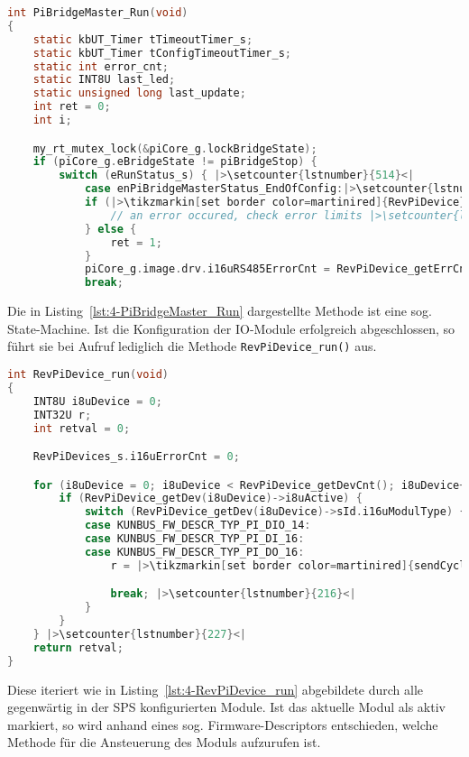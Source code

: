 \begin{lstlisting}[language={c},firstnumber=262,caption={Auszug der Methode \lstinline{PiBridgeMaster_Run(void)} in \lstinline{RevPiDevice.c}\label{lst:4-PiBridgeMaster_Run}}]
int PiBridgeMaster_Run(void)
{
	static kbUT_Timer tTimeoutTimer_s;
	static kbUT_Timer tConfigTimeoutTimer_s;
	static int error_cnt;
	static INT8U last_led;
	static unsigned long last_update;
	int ret = 0;
	int i;

	my_rt_mutex_lock(&piCore_g.lockBridgeState);
	if (piCore_g.eBridgeState != piBridgeStop) {
		switch (eRunStatus_s) { |>\setcounter{lstnumber}{514}<|
		    case enPiBridgeMasterStatus_EndOfConfig:|>\setcounter{lstnumber}{621}<|
		    if (|>\tikzmarkin[set border color=martinired]{RevPiDevice}<|RevPiDevice_run()|>\tikzmarkend{RevPiDevice}<|) {
				// an error occured, check error limits |>\setcounter{lstnumber}{641}<|
			} else {
				ret = 1;
			}
			piCore_g.image.drv.i16uRS485ErrorCnt = RevPiDevice_getErrCnt();
			break;
\end{lstlisting}

Die in Listing~\ref{lst:4-PiBridgeMaster_Run} dargestellte Methode ist eine sog. State-Machine. Ist die Konfiguration der IO-Module erfolgreich abgeschlossen, so führt sie bei Aufruf lediglich die Methode \lstinline{RevPiDevice_run()} aus.

\begin{lstlisting}[language={c},firstnumber=140,caption={Auszug der Methode \lstinline{RevPiDevice_run(void)} in \lstinline{RevPiDevice.c}\label{lst:4-RevPiDevice_run}}]
int RevPiDevice_run(void)
{
	INT8U i8uDevice = 0;
	INT32U r;
	int retval = 0;

	RevPiDevices_s.i16uErrorCnt = 0;

	for (i8uDevice = 0; i8uDevice < RevPiDevice_getDevCnt(); i8uDevice++) {
		if (RevPiDevice_getDev(i8uDevice)->i8uActive) {
			switch (RevPiDevice_getDev(i8uDevice)->sId.i16uModulType) {
			case KUNBUS_FW_DESCR_TYP_PI_DIO_14:
			case KUNBUS_FW_DESCR_TYP_PI_DI_16:
			case KUNBUS_FW_DESCR_TYP_PI_DO_16:
				r = |>\tikzmarkin[set border color=martinired]{sendCyclicTelegram}<|piDIOComm_sendCyclicTelegram(i8uDevice)|>\tikzmarkend{sendCyclicTelegram}\setcounter{lstnumber}{166} <|;

				break; |>\setcounter{lstnumber}{216}<|
			}
		}
	} |>\setcounter{lstnumber}{227}<|
	return retval;
}
\end{lstlisting}

Diese iteriert wie in Listing~\ref{lst:4-RevPiDevice_run} abgebildete durch alle gegenwärtig in der SPS konfigurierten Module. Ist das aktuelle Modul als aktiv markiert, so wird anhand eines sog. Firmware-Descriptors entschieden, welche Methode für die Ansteuerung des Moduls aufzurufen ist.

